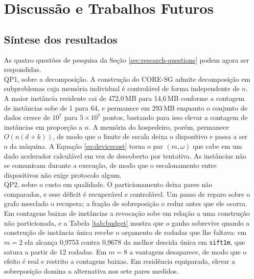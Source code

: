 
\chapter{Discussão e Trabalhos Futuros\label{cha:discussion}}

\section{Síntese dos resultados\label{sec:disc-summary}}

As quatro questões de pesquisa da Seção \ref{sec:research-questions} podem agora ser respondidas.\\

QP1, sobre a decomposição. A construção do \ac{CORE-SG} admite decomposição em subproblemas cuja memória individual é controlável de forma independente de $n$. A maior instância residente cai de 472,0\,MB para 14,6\,MB conforme a contagem de instâncias sobe de 1 para 64, e permanece em 293\,MB enquanto o conjunto de dados cresce de $10^7$ para $5 \times 10^7$ pontos, bastando para isso elevar a contagem de instâncias em proporção a $n$. A memória do hospedeiro, porém, permanece $O(n(d+k))$, de modo que o limite de escala deixa o dispositivo e passa a ser o da máquina. A Equação \eqref{eq:devicecost} torna o par $(m, \omega)$ que cabe em um dado acelerador calculável em vez de descoberto por tentativa. As instâncias não se comunicam durante a execução, de modo que o escalonamento entre dispositivos não exige protocolo algum.\\

QP2, sobre o custo em qualidade. O particionamento deixa pares não comparados, e esse déficit é recuperável e controlável. Um passo de reparo sobre o grafo mesclado o recupera; a fração de sobreposição o reduz antes que ele ocorra. Em contagens baixas de instâncias a revocação sobe em relação a uma construção não particionada, e a Tabela \ref{tab:budget} mostra que o ganho sobrevive quando a construção de instância única recebe o orçamento de rodadas que lhe faltava: em $m = 2$ ela alcança 0,9753 contra 0,9678 da melhor descida única em \texttt{sift1m}, que satura a partir de 12 rodadas. Em $m = 8$ a vantagem desaparece, de modo que o efeito é real e restrito a contagens baixas. Em residência equiparada, elevar a sobreposição domina a alternativa nos sete pares medidos.\\

